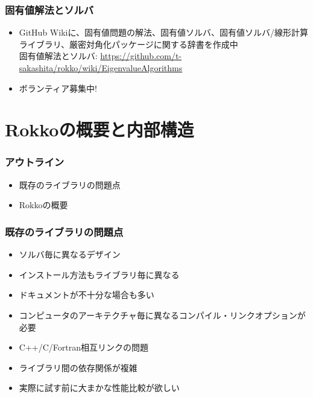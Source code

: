 \begin{frame}
  \frametitle{固有値解法とソルバ}
  \begin{itemize}
    \item GitHub Wikiに、固有値問題の解法、固有値ソルバ、固有値ソルバ/線形計算ライブラリ、厳密対角化パッケージに関する辞書を作成中 \\
      固有値解法とソルバ: \url{https://github.com/t-sakashita/rokko/wiki/EigenvalueAlgorithms}
    \item ボランティア募集中!
  \end{itemize}
\end{frame}
        
\section{Rokkoの概要と内部構造}

\begin{frame}
  \frametitle{アウトライン}
  \begin{itemize}
  \item 既存のライブラリの問題点
  \item Rokkoの概要
  \end{itemize}
\end{frame}

\begin{frame}
  \frametitle{既存のライブラリの問題点}
  \begin{itemize}
  \item ソルバ毎に異なるデザイン
  \item インストール方法もライブラリ毎に異なる
  \item ドキュメントが不十分な場合も多い
  \item コンピュータのアーキテクチャ毎に異なるコンパイル・リンクオプションが必要
  \item C++/C/Fortran相互リンクの問題
  \item ライブラリ間の依存関係が複雑
  \item 実際に試す前に大まかな性能比較が欲しい
  \end{itemize}
\end{frame}


